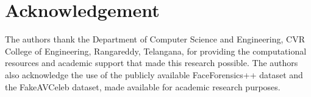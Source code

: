 \documentclass[conference]{IEEEtran}
\begin{document}
\section*{Acknowledgement}
The authors thank the Department of Computer Science and Engineering, CVR College of
Engineering, Rangareddy, Telangana, for providing the computational resources and 
academic support that made this research possible. The authors also acknowledge the 
use of the publicly available FaceForensics++ dataset and the FakeAVCeleb dataset, 
made available for academic research purposes.



\end{document}
